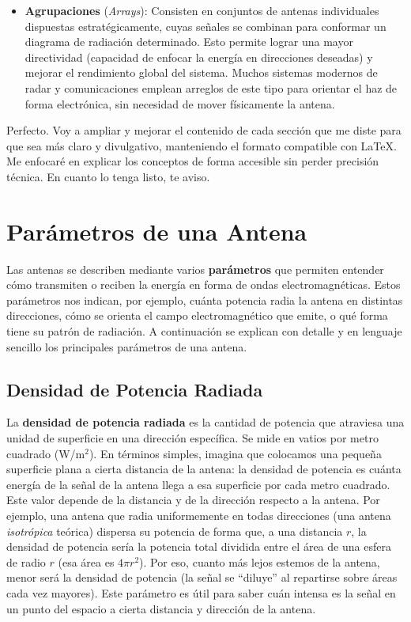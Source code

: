 \begin{itemize}
    \item \textbf{Agrupaciones} (\textit{Arrays}): Consisten en conjuntos de antenas individuales dispuestas estratégicamente, cuyas señales se combinan para conformar un diagrama de radiación determinado. Esto permite lograr una mayor directividad (capacidad de enfocar la energía en direcciones deseadas) y mejorar el rendimiento global del sistema. Muchos sistemas modernos de radar y comunicaciones emplean arreglos de este tipo para orientar el haz de forma electrónica, sin necesidad de mover físicamente la antena.\\
\end{itemize}

Perfecto. Voy a ampliar y mejorar el contenido de cada sección que me diste para que sea más claro y divulgativo, manteniendo el formato compatible con LaTeX. Me enfocaré en explicar los conceptos de forma accesible sin perder precisión técnica. En cuanto lo tenga listo, te aviso.

\section{Parámetros de una Antena}

Las antenas se describen mediante varios \textbf{parámetros} que permiten entender cómo transmiten o reciben la energía en forma de ondas electromagnéticas. Estos parámetros nos indican, por ejemplo, cuánta potencia radia la antena en distintas direcciones, cómo se orienta el campo electromagnético que emite, o qué forma tiene su patrón de radiación. A continuación se explican con detalle y en lenguaje sencillo los principales parámetros de una antena.

\subsection{Densidad de Potencia Radiada}

La \textbf{densidad de potencia radiada} es la cantidad de potencia que atraviesa una unidad de superficie en una dirección específica. Se mide en vatios por metro cuadrado (W/m\(^2\)). En términos simples, imagina que colocamos una pequeña superficie plana a cierta distancia de la antena: la densidad de potencia es cuánta energía de la señal de la antena llega a esa superficie por cada metro cuadrado. Este valor depende de la distancia y de la dirección respecto a la antena. Por ejemplo, una antena que radia uniformemente en todas direcciones (una antena \textit{isotrópica} teórica) dispersa su potencia de forma que, a una distancia $r$, la densidad de potencia sería la potencia total dividida entre el área de una esfera de radio $r$ (esa área es $4\pi r^2$). Por eso, cuanto más lejos estemos de la antena, menor será la densidad de potencia (la señal se “diluye” al repartirse sobre áreas cada vez mayores). Este parámetro es útil para saber cuán intensa es la señal en un punto del espacio a cierta distancia y dirección de la antena.

